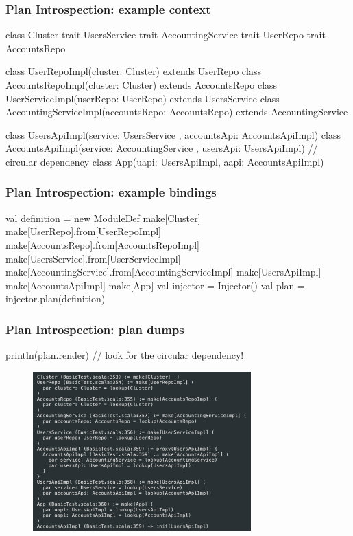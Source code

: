\documentclass[usenames,dvipsnames]{beamer}
\begin{document}
\begin{frame}[fragile]
\frametitle{Plan Introspection: example context}
\begin{scalacode}
class Cluster
trait UsersService
trait AccountingService
trait UserRepo
trait AccountsRepo

class UserRepoImpl(cluster: Cluster) extends UserRepo
class AccountsRepoImpl(cluster: Cluster) extends AccountsRepo
class UserServiceImpl(userRepo: UserRepo) extends UsersService
class AccountingServiceImpl(accountsRepo: AccountsRepo) 
    extends AccountingService

class UsersApiImpl(service: UsersService
    , accountsApi: AccountsApiImpl)
class AccountsApiImpl(service: AccountingService
    , usersApi: UsersApiImpl) // circular dependency
class App(uapi: UsersApiImpl, aapi: AccountsApiImpl)
\end{scalacode}
\end{frame}

\begin{frame}[fragile]
\frametitle{Plan Introspection: example bindings\footnotemark[1]}
\begin{scalacode}
val definition = new ModuleDef {
    make[Cluster]
    make[UserRepo].from[UserRepoImpl]
    make[AccountsRepo].from[AccountsRepoImpl]
    make[UsersService].from[UserServiceImpl]
    make[AccountingService].from[AccountingServiceImpl]
    make[UsersApiImpl]
    make[AccountsApiImpl]
    make[App]
}
val injector = Injector()
val plan = injector.plan(definition)
\end{scalacode}
\end{frame}

\begin{frame}[fragile]
\frametitle{Plan Introspection: plan dumps}
\begin{scalacode}
println(plan.render) // look for the circular dependency!
\end{scalacode}

\begin{figure}
    \includegraphics[width=0.75\textwidth]{media/plan-example.png}
\end{figure}
\end{frame}
\end{document}
